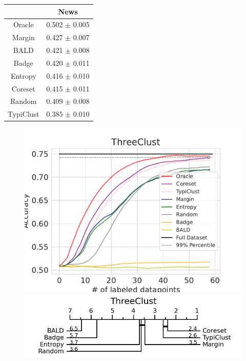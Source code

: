 \documentclass[]{article}
\begin{document}
\begin{minipage}{0.29\linewidth}
\begin{tabular}{c|c}
&News\\
\hline
Oracle&0.502 $\pm$ 0.005\\
Margin&0.427 $\pm$ 0.007\\
BALD&0.421 $\pm$ 0.008\\
Badge&0.420 $\pm$ 0.011\\
Entropy&0.416 $\pm$ 0.010\\
Coreset&0.415 $\pm$ 0.011\\
Random&0.409 $\pm$ 0.008\\
TypiClust&0.385 $\pm$ 0.010\\
\end{tabular}
\end{minipage}
\begin{minipage}{0.65\linewidth}
\begin{figure}[H]
    \centering
\includegraphics[width=\linewidth]{img/eval_threeclust.pdf} \\[2mm]
\includegraphics[width=\linewidth]{img/micro_threeclust.jpg}
\end{figure}
\end{minipage}
\end{document}
